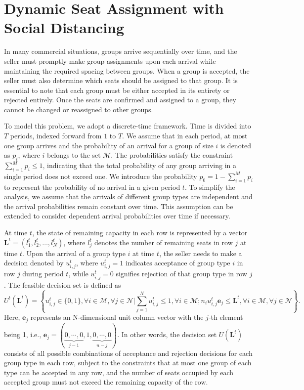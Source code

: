 \section{Dynamic Seat Assignment with Social Distancing}\label{sec_dynamic_seat}
In many commercial situations, groups arrive sequentially over time, and the seller must promptly make group assignments upon each arrival while maintaining the required spacing between groups. When a group is accepted, the seller must also determine which seats should be assigned to that group. It is essential to note that each group must be either accepted in its entirety or rejected entirely. Once the seats are confirmed and assigned to a group, they cannot be changed or reassigned to other groups.

To model this problem, we adopt a discrete-time framework. Time is divided into $T$ periods, indexed forward from $1$ to $T$. We assume that in each period, at most one group arrives and the probability of an arrival for a group of size $i$ is denoted as $p_i$, where $i$ belongs to the set $\mathcal{M}$. The probabilities satisfy the constraint $\sum_{i=1}^M p_i \leq 1$, indicating that the total probability of any group arriving in a single period does not exceed one. We introduce the probability $p_0 = 1 - \sum_{i=1}^{M} p_i$ to represent the probability of no arrival in a given period $t$. To simplify the analysis, we assume that the arrivals of different group types are independent and the arrival probabilities remain constant over time. This assumption can be extended to consider dependent arrival probabilities over time if necessary.

At time $t$, the state of remaining capacity in each row is represented by a vector $\mathbf{L}^{t} = (l_1^{t}, l_2^{t}, \ldots, l_N^{t})$, where $l_j^{t}$ denotes the number of remaining seats in row $j$ at time $t$. Upon the arrival of a group type $i$ at time $t$, the seller needs to make a decision denoted by $u_{i,j}^{t}$, where $u_{i,j}^{t} = 1$ indicates acceptance of group type $i$ in row $j$ during period $t$, while $u_{i,j}^{t} = 0$ signifies rejection of that group type in row $j$. The feasible decision set is defined as $$U^{t}(\mathbf{L}^{t}) = \left\{u_{i,j}^{t} \in \{0,1\}, \forall i \in \mathcal{M}, \forall j \in \mathcal{N} \big| \sum_{j=1}^{N} u_{i,j}^{t} \leq 1, \forall i \in \mathcal{M}; n_{i}u_{i,j}^{t}\mathbf{e}_j \leq \mathbf{L}^{t}, \forall i \in \mathcal{M}, \forall j \in \mathcal{N}\right\}.$$ 
Here, $\mathbf{e}_j$ represents an N-dimensional unit column vector with the $j$-th element being 1, i.e., $\mathbf{e}_j = (\underbrace{0, \cdots, 0}_{j-1}, 1, \underbrace{0, \cdots, 0}_{n-j})$. In other words, the decision set $U(\mathbf{L}^{t})$ consists of all possible combinations of acceptance and rejection decisions for each group type in each row, subject to the constraints that at most one group of each type can be accepted in any row, and the number of seats occupied by each accepted group must not exceed the remaining capacity of the row.

